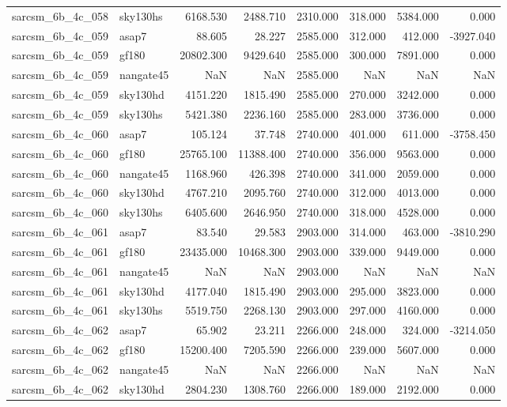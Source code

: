\begin{tabular}{llrrrrrr}
sarcsm\_6b\_4c\_058 & sky130hs & 6168.530 & 2488.710 & 2310.000 & 318.000 & 5384.000 & 0.000 \\
sarcsm\_6b\_4c\_059 & asap7 & 88.605 & 28.227 & 2585.000 & 312.000 & 412.000 & -3927.040 \\
sarcsm\_6b\_4c\_059 & gf180 & 20802.300 & 9429.640 & 2585.000 & 300.000 & 7891.000 & 0.000 \\
sarcsm\_6b\_4c\_059 & nangate45 & NaN & NaN & 2585.000 & NaN & NaN & NaN \\
sarcsm\_6b\_4c\_059 & sky130hd & 4151.220 & 1815.490 & 2585.000 & 270.000 & 3242.000 & 0.000 \\
sarcsm\_6b\_4c\_059 & sky130hs & 5421.380 & 2236.160 & 2585.000 & 283.000 & 3736.000 & 0.000 \\
sarcsm\_6b\_4c\_060 & asap7 & 105.124 & 37.748 & 2740.000 & 401.000 & 611.000 & -3758.450 \\
sarcsm\_6b\_4c\_060 & gf180 & 25765.100 & 11388.400 & 2740.000 & 356.000 & 9563.000 & 0.000 \\
sarcsm\_6b\_4c\_060 & nangate45 & 1168.960 & 426.398 & 2740.000 & 341.000 & 2059.000 & 0.000 \\
sarcsm\_6b\_4c\_060 & sky130hd & 4767.210 & 2095.760 & 2740.000 & 312.000 & 4013.000 & 0.000 \\
sarcsm\_6b\_4c\_060 & sky130hs & 6405.600 & 2646.950 & 2740.000 & 318.000 & 4528.000 & 0.000 \\
sarcsm\_6b\_4c\_061 & asap7 & 83.540 & 29.583 & 2903.000 & 314.000 & 463.000 & -3810.290 \\
sarcsm\_6b\_4c\_061 & gf180 & 23435.000 & 10468.300 & 2903.000 & 339.000 & 9449.000 & 0.000 \\
sarcsm\_6b\_4c\_061 & nangate45 & NaN & NaN & 2903.000 & NaN & NaN & NaN \\
sarcsm\_6b\_4c\_061 & sky130hd & 4177.040 & 1815.490 & 2903.000 & 295.000 & 3823.000 & 0.000 \\
sarcsm\_6b\_4c\_061 & sky130hs & 5519.750 & 2268.130 & 2903.000 & 297.000 & 4160.000 & 0.000 \\
sarcsm\_6b\_4c\_062 & asap7 & 65.902 & 23.211 & 2266.000 & 248.000 & 324.000 & -3214.050 \\
sarcsm\_6b\_4c\_062 & gf180 & 15200.400 & 7205.590 & 2266.000 & 239.000 & 5607.000 & 0.000 \\
sarcsm\_6b\_4c\_062 & nangate45 & NaN & NaN & 2266.000 & NaN & NaN & NaN \\
sarcsm\_6b\_4c\_062 & sky130hd & 2804.230 & 1308.760 & 2266.000 & 189.000 & 2192.000 & 0.000 \\

\end{tabular}
